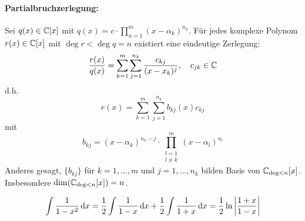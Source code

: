 \begin{example}
\paragraph{Partialbruchzerlegung:} Sei $q(x) \in \mathbb{C} [x]$ mit $q(x) = c \cdot \prod_{n=1}^m (x-\alpha_k)^{n_k} $. \linebreak Für jedes komplexe Polynom $r(x) \in \mathbb{C}[x]$ mit $\deg r < \deg q =n $ existiert eine eindeutige Zerlegung:
$$
\frac{r(x)}{q(x)} = \sum_{k=1}^m \sum_{j=1}^{n_k} \frac{c_{kj}}{(x-x_k)^j}, \quad c_{jk} \in \mathbb{C}
$$
d.h.
$$r(x) = \sum_{k=1}^m \sum_{j=1}^{n_k} b_{kj}(x) c_{kj}$$
mit 
$$b_{kj} = (x-\alpha_k)^{n_k-j} \cdot \prod_{\substack{l=1 \\ l \neq k}}^m (x-\alpha_l)^{n_l}$$
Anderes gesagt, $\{b_{kj}\}$ für $k=1,...,m$ und $j=1,...,n_k$ bilden Basis von $\mathbb{C}_{\deg<n}[x]$. Insbesondere $\dim( \mathbb{C}_{\deg <n}[x])=n$.

\begin{example}
$$\int \frac{1}{1-x^2} \, \mathrm{d} x = \frac{1}{2} \int \frac{1}{1-x} \, \mathrm{d} x + \frac{1}{2} \int \frac{1}{1+x} \, \mathrm{d} x = \frac{1}{2} \ln \left| \frac{1+x}{1-x} \right|$$
\end{example}
\end{example}